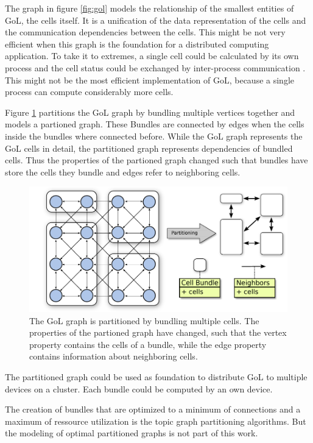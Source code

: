 The graph in figure \ref{fig:gol} models the relationship of the
smallest entities of GoL, the cells itself. It is a unification of the
data representation of the cells and the communication dependencies
between the cells. This might be not very efficient when this graph is
the foundation for a distributed computing application. To take it to
extremes, a single cell could be calculated by its own process and the
cell status could be exchanged by inter-process communication
. This might not be the most efficient implementation of GoL,
because a single process can compute considerably more cells.

Figure \ref{fig:gol_bundle} partitions the GoL graph by bundling
multiple vertices together and models a partioned graph. These Bundles are
connected by edges when the cells inside the bundles where connected
before. While the GoL graph represents the GoL cells in detail, the
partitioned graph represents dependencies of bundled cells. Thus
the properties of the partioned graph changed such that bundles
have store the cells they bundle and edges refer to neighboring
cells.

\begin{figure}[H]
  \centering \includegraphics[width=\textwidth]{graphics/30_gol_bundle}
  \caption{The GoL graph is partitioned by bundling multiple
    cells. The properties of the partioned graph have changed, such
    that the vertex property contains the cells of a bundle, while the
    edge property contains information about neighboring cells.}
  \label{fig:gol_bundle}
\end{figure}

The partitioned graph could be used as foundation to distribute GoL to
multiple devices on a cluster. Each bundle could be computed by an own
device. 

The creation of bundles that are optimized to a minimum of connections
and a maximum of ressource utilization is the topic graph partitioning
algorithms. But the modeling of optimal partitioned graphs is not part
of this work.

